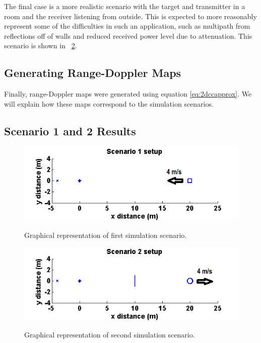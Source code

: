 \documentclass[article,11pt,onecolumn,final]{IEEEtran}
\begin{document}
The final case is a more realistic scenario with the target and transmitter in a room and the receiver listening from outside. This is expected to more reasonably represent some of the difficulties in such an application, such as multipath from reflections off of walls and reduced received power level due to attenuation. This scenario is shown in ~\ref{fig:sim2}.

\subsection{Generating Range-Doppler Maps}
Finally, range-Doppler maps were generated using equation \eqref{eq:2dccapprox}. We will explain how these maps correspond to the simulation scenarios.

\subsection{Scenario 1 and 2 Results}

\begin{figure}[H]
	\caption{Graphical representation of first simulation scenario.}
	\centering
	\includegraphics[width=400pt]{figures/sim1.png}
	\label{fig:sim1}
\end{figure}

\begin{figure}[H]
	\caption{Graphical representation of second simulation scenario.}
	\centering
	\includegraphics[width=400pt]{figures/sim2.png}
	\label{fig:sim2}
\end{figure}
\end{document}
